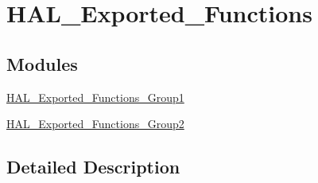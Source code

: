 \hypertarget{group___h_a_l___exported___functions}{\section{H\-A\-L\-\_\-\-Exported\-\_\-\-Functions}
\label{group___h_a_l___exported___functions}
}
\subsection*{Modules}
\begin{DoxyCompactItemize}
\item 
\hyperlink{group___h_a_l___exported___functions___group1}{H\-A\-L\-\_\-\-Exported\-\_\-\-Functions\-\_\-\-Group1}
\item 
\hyperlink{group___h_a_l___exported___functions___group2}{H\-A\-L\-\_\-\-Exported\-\_\-\-Functions\-\_\-\-Group2}
\end{DoxyCompactItemize}


\subsection{Detailed Description}
